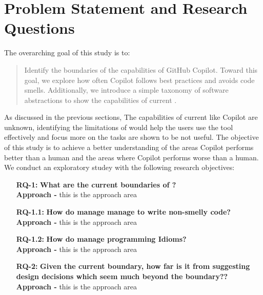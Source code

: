 \section{Problem Statement and Research Questions}
The overarching goal of this study is to:
\begin{quote}
    Identify the boundaries of the capabilities of GitHub Copilot. Toward this goal, we explore how often Copilot follows best practices and avoids code smells. Additionally, we introduce a simple taxonomy of software abstractions to show the capabilities of current \cct{}. 
\end{quote}

As discussed in the previous sections, The capabilities of current \cct{} like Copilot are unknown, identifying the limitations of \cct{} would help the users use the tool effectively and focus more on the tasks \cct{} are shown to be not useful. The objective of this study is to achieve a better understanding of the areas Copilot performs better than a human and the areas where Copilot performs worse than a human. We conduct an exploratory studey with the following research objectives:

\begin{enumerate}
  \item[\textbf{RQ-1: }]
  \textbf{What are the current boundaries of \cct{}?} \\
  \textbf{Approach -} this is the approach area
  
  \item[\textbf{RQ-1.1: }]
  \textbf{How do \cct{} manage manage to write non-smelly code?} \\
  \textbf{Approach -} this is the approach area
  
  \item[\textbf{RQ-1.2: }]
  \textbf{How do \cct{} manage programming Idioms?} \\
  \textbf{Approach -} this is the approach area
  
  \item[\textbf{RQ-2: }]
  \textbf{Given the current boundary, how far is it from suggesting design decisions which seem much beyond the boundary??} \\
  \textbf{Approach -} this is the approach area
\end{enumerate}